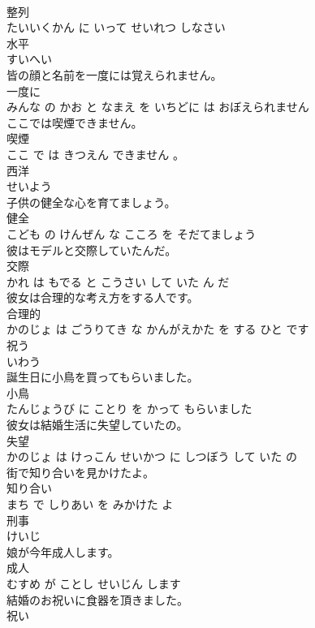 \documentclass[8pt]{extreport}
\begin{document}
\begin{CJK}{UTF8}{min}
\\	整列 
\\	たいいくかん に いって せいれつ しなさい			
\\	水平	
\\	すいへい		
\\	皆の顔と名前を一度には覚えられません。	
\\	一度に 
\\	みんな の かお と なまえ を いちどに は おぼえられません			
\\	ここでは喫煙できません。	
\\	喫煙 
\\	ここ で は きつえん できません 。			
\\	西洋	
\\	せいよう		
\\	子供の健全な心を育てましょう。	
\\	健全 
\\	こども の けんぜん な こころ を そだてましょう			
\\	彼はモデルと交際していたんだ。	
\\	交際 
\\	かれ は もでる と こうさい して いた ん だ			
\\	彼女は合理的な考え方をする人です。	
\\	合理的 
\\	かのじょ は ごうりてき な かんがえかた を する ひと です			
\\	祝う	
\\	いわう		
\\	誕生日に小鳥を買ってもらいました。	
\\	小鳥 
\\	たんじょうび に ことり を かって もらいました			
\\	彼女は結婚生活に失望していたの。	
\\	失望 
\\	かのじょ は けっこん せいかつ に しつぼう して いた の			
\\	街で知り合いを見かけたよ。	
\\	知り合い 
\\	まち で しりあい を みかけた よ			
\\	刑事	
\\	けいじ		
\\	娘が今年成人します。	
\\	成人 
\\	むすめ が ことし せいじん します			
\\	結婚のお祝いに食器を頂きました。	
\\	祝い 

\end{CJK}
\end{document}
